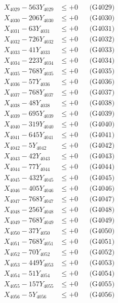 \documentclass[a4paper,10pt]{article}
\begin{document}
{\begin{align}
X_{4029} - 563Y_{4029} &\leq +0 && \text{(G4029)} \\
X_{4030} - 206Y_{4030} &\leq +0 && \text{(G4030)} \\
\allowbreak
X_{4031} - 63Y_{4031} &\leq +0 && \text{(G4031)} \\
X_{4032} - 726Y_{4032} &\leq +0 && \text{(G4032)} \\
X_{4033} - 41Y_{4033} &\leq +0 && \text{(G4033)} \\
X_{4034} - 223Y_{4034} &\leq +0 && \text{(G4034)} \\
X_{4035} - 768Y_{4035} &\leq +0 && \text{(G4035)} \\
X_{4036} - 57Y_{4036} &\leq +0 && \text{(G4036)} \\
X_{4037} - 768Y_{4037} &\leq +0 && \text{(G4037)} \\
X_{4038} - 48Y_{4038} &\leq +0 && \text{(G4038)} \\
X_{4039} - 695Y_{4039} &\leq +0 && \text{(G4039)} \\
X_{4040} - 319Y_{4040} &\leq +0 && \text{(G4040)} \\
\allowbreak
X_{4041} - 645Y_{4041} &\leq +0 && \text{(G4041)} \\
X_{4042} - 5Y_{4042} &\leq +0 && \text{(G4042)} \\
X_{4043} - 42Y_{4043} &\leq +0 && \text{(G4043)} \\
X_{4044} - 77Y_{4044} &\leq +0 && \text{(G4044)} \\
X_{4045} - 432Y_{4045} &\leq +0 && \text{(G4045)} \\
X_{4046} - 405Y_{4046} &\leq +0 && \text{(G4046)} \\
X_{4047} - 768Y_{4047} &\leq +0 && \text{(G4047)} \\
X_{4048} - 256Y_{4048} &\leq +0 && \text{(G4048)} \\
X_{4049} - 768Y_{4049} &\leq +0 && \text{(G4049)} \\
X_{4050} - 37Y_{4050} &\leq +0 && \text{(G4050)} \\
\allowbreak
X_{4051} - 768Y_{4051} &\leq +0 && \text{(G4051)} \\
X_{4052} - 70Y_{4052} &\leq +0 && \text{(G4052)} \\
X_{4053} - 449Y_{4053} &\leq +0 && \text{(G4053)} \\
X_{4054} - 51Y_{4054} &\leq +0 && \text{(G4054)} \\
X_{4055} - 157Y_{4055} &\leq +0 && \text{(G4055)} \\
X_{4056} - 5Y_{4056} &\leq +0 && \text{(G4056)} \\

\end{align}}
\end{document}
